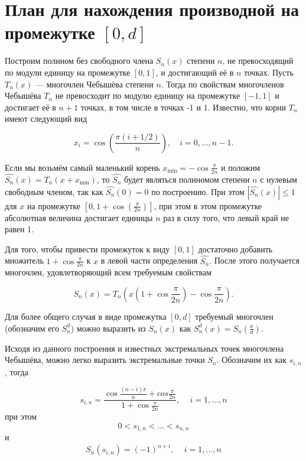 \documentclass[specialist,
               substylefile = spbu.rtx,
               subf,href,colorlinks=true, 12pt]{disser}
\theoremstyle{definition}
\newcommand\abs[1]{\left\lvert#1\right\rvert}
\begin{document}
	
	
  
  \chapter{План для нахождения производной на промежутке $[0, d]$}


	Построим полином без свободного члена $S_n(x)$ степени $n$, не превосходящий по модули единицу на промежутке $[0, 1]$, и достигающий её в $n$ точках. Пусть $T_n(x)$ --- многочлен Чебышёва степени $n$. Тогда по свойствам многочленов Чебышёва $T_n$ не превосходит по модулю единицу на промежутке $[-1, 1]$ и достигает её в $n+1$ точках, в том числе в точках -1 и 1. Известно, что корни $T_n$ имеют следующий вид
	
	\begin{equation*}
		x_{i}=\cos \left({\frac {\pi (i+1/2)}{n}}\right),\quad i=0,\ldots ,n-1.
	\end{equation*}	 
	
	Если мы возьмём самый маленький корень $x_{\text{min}} = - \cos \frac{\pi}{2n}$ и положим $\widehat{S_n}(x) = T_n(x + x_{\text{min}})$, то $\widehat{S_n}$ будет являться полиномом степени $n$ с нулевым свободным членом, так как $\widehat{S_n}(0) = 0$ по построению. При этом $\abs{\widehat{S_n}(x)} \leqslant 1$ для $x$ на промежутке $[0, 1+ \cos \left(\frac{\pi}{2n}\right)]$, при этом в этом промежутке абсолютная величина достигает единицы $n$ раз в силу того, что левый край не равен 1.
	
	Для того, чтобы привести промежуток к виду $[0, 1]$ достаточно добавить множитель $1 + \cos \frac{\pi}{2n}$  к $x$ в левой части определения $\widehat{S_n}$. После этого получается многочлен, удовлетворяющий всем требуемым свойствам
	
	\begin{equation*}
		S_n(x) = T_n \left(x \left(1 + \cos \frac{\pi}{2n} \right) - \cos \frac{\pi}{2n} \right).
	\end{equation*}	
	
	Для более общего случая в виде промежутка $[0, d]$ требуемый многочлен (обозначим его $S_n^d$) можно выразить из $S_n(x)$ как $S_n^d(x) = S_n\left(\frac{x}{d}\right)$.
	
	Исходя из данного построения и известных экстремальных точек многочлена Чебышёва, можно легко выразить экстремальные точки $S_n$. Обозначим их как $s_{i, n}$, тогда
	
	\begin{equation*}
		s_{i, n} = \frac{\cos \frac{(n - i) \pi}{n} + cos \frac{\pi}{2n}}{1 + \cos \frac{\pi}{2n}} , \, \quad i = 1, \ldots, n 
	\end{equation*}
	при этом
	\begin{equation*}
		0 < s_{1, n} < \ldots < s_{n, n}
	\end{equation*}
	и
	\begin{equation*}
		S_n(s_{i, n}) = (-1)^{n + i} , \, \quad i = 1, \ldots, n 
	\end{equation*}
\end{document}
